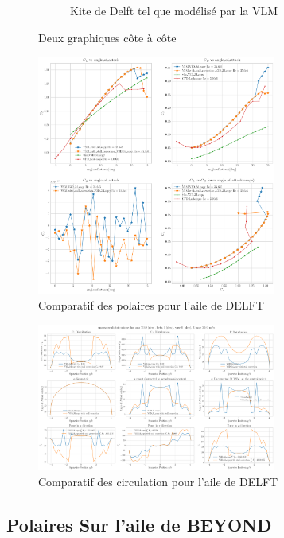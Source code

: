 \documentclass[conference]{IEEEtran}
\begin{document}
\begin{figure}[H]
\begin{subfigure}[b]{0.45\textwidth}
        \caption{Kite de Delft tel que modélisé par la VLM}
        \label{fig:Kite de Delft tel que modélisé par la VLM}
    \end{subfigure}
    \caption{Deux graphiques côte à côte}
    \label{fig:deux_graphiques}
\end{figure}

\begin{figure}[H]
    \centering
    \includegraphics[width=0.7\textwidth]{Pics/polar delft.png}
    \caption{Comparatif des polaires pour l'aile de DELFT}
    \label{fig:Comparatif des polaires pour l'aile de DELFT}
\end{figure}

\begin{figure}[H]
    \centering
    \includegraphics[width=0.7\textwidth]{Pics/circulation DELFT.png}
    \caption{Comparatif des circulation pour l'aile de DELFT}
    \label{fig:Comparatif des circulation pour l'aile de DELFT}
\end{figure}


\subsection{Polaires Sur l'aile de BEYOND} 
\end{document}
